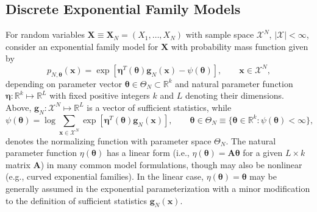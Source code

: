 \documentclass[]{article}
\theoremstyle{definition}
\begin{document}
\subsection{Discrete Exponential Family
Models}\label{discrete-exponential-family-models}

For random variables
\(\boldsymbol X \equiv\boldsymbol X_N= (X_1, \dots, X_N)\) with sample
space \(\mathcal{X}^N\), \(|\mathcal{X}| < \infty\), consider an
exponential family model for \(\boldsymbol X\) with probability mass
function given by
\begin{equation}
\label{eq:expo}
p_{N, \boldsymbol \theta}(\boldsymbol x) = \exp\left[\boldsymbol\eta^T(\boldsymbol \theta) \boldsymbol g_N(\boldsymbol x) - \psi(\boldsymbol \theta)\right], \qquad \boldsymbol x \in \mathcal{X}^N,
\end{equation}
depending on parameter vector
\(\boldsymbol \theta \in \Theta_N \subset \mathbb{R}^{k}\) and natural
parameter function
\(\boldsymbol \eta : \mathbb{R}^k \mapsto \mathbb{R}^L\) with fixed
positive integers \(k\) and \(L\) denoting their dimensions. Above,
\(\boldsymbol g_N : \mathcal{X}^N \mapsto \mathbb{R}^L\) is a vector of
sufficient statistics, while \[
\psi(\boldsymbol \theta) = \log \sum\limits_{\boldsymbol x \in \mathcal{X}^N}\exp\left[\boldsymbol \eta^T(\boldsymbol \theta) \boldsymbol g_N(\boldsymbol x) \right], \qquad \boldsymbol \theta \in \Theta_N\equiv \{\boldsymbol \theta \in \mathbb{R}^k : \psi(\boldsymbol \theta) < \infty \},
\] denotes the normalizing function with parameter space \(\Theta_N\).
The natural parameter function \(\eta (\boldsymbol \theta)\) has a
linear form (i.e.,
\(\eta (\boldsymbol \theta)= \bm{A} \boldsymbol \theta\) for a given
\(L \times k\) matrix \(\bm{A}\)) in many common model formulations,
though may also be nonlinear (e.g., curved exponential families). In the
linear case, \(\eta (\boldsymbol \theta) = \boldsymbol \theta\) may be
generally assumed in the exponential parameterization with a minor
modification to the definition of sufficient statistics
\(\boldsymbol g_N(\boldsymbol x)\).
\end{document}
